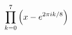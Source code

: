\documentclass[preview]{standalone}
\begin{document}
\begin{align*}
\special{dvisvgm:raw <g id='unique000'>}\displaystyle\prod_{k=0}^{7}\left(x-e^{2\pi ik/8}\right)\special{dvisvgm:raw </g>}
\end{align*}
\end{document}
